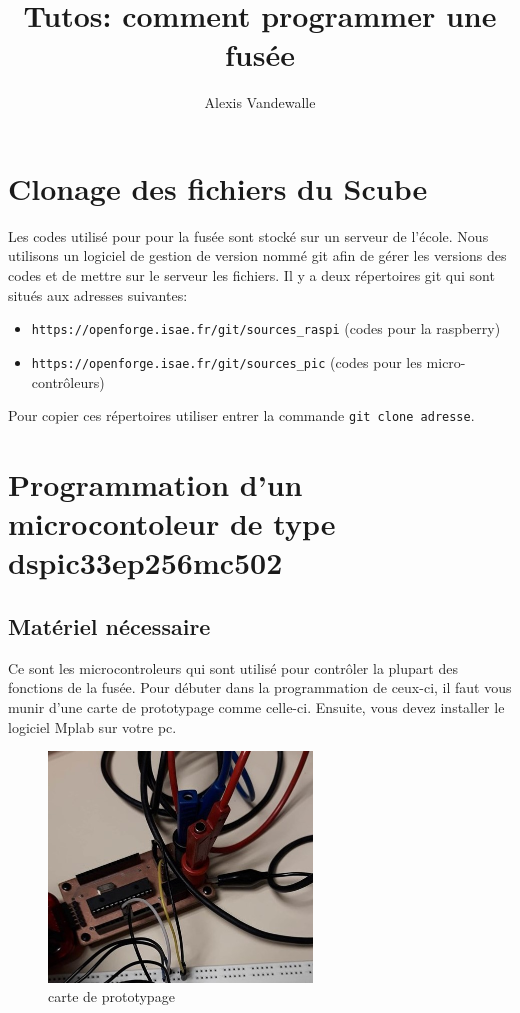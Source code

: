 \documentclass{article}
\title{Tutos: comment programmer une fusée}
\author{Alexis Vandewalle}
\begin{document}
\maketitle
\section{Clonage des fichiers du Scube}
Les codes utilisé pour pour la fusée sont stocké sur un serveur de l'école. Nous utilisons un logiciel de
gestion de version nommé git afin de gérer les versions des codes et de mettre sur le serveur les fichiers.
Il y a deux répertoires git qui sont situés aux adresses suivantes:
\begin{itemize}
\item \verb"https://openforge.isae.fr/git/sources_raspi" (codes pour la raspberry)
\item \verb"https://openforge.isae.fr/git/sources_pic" (codes pour les micro-contrôleurs)
\end{itemize}
Pour copier ces répertoires utiliser entrer la commande \verb"git clone adresse".

\section{Programmation d'un microcontoleur de type dspic33ep256mc502}
\subsection{Matériel nécessaire}
Ce sont les microcontroleurs qui sont utilisé pour contrôler la plupart des fonctions de la fusée.
Pour débuter dans la programmation de ceux-ci, il faut vous munir d'une carte de prototypage comme celle-ci.
Ensuite, vous devez installer le logiciel Mplab sur votre pc.

\begin{figure}[H]
    \centering
    \includegraphics[width=7cm]{carteProto}
	\caption{carte de prototypage}
	\label{carteProto}
\end{figure}
\end{document}
